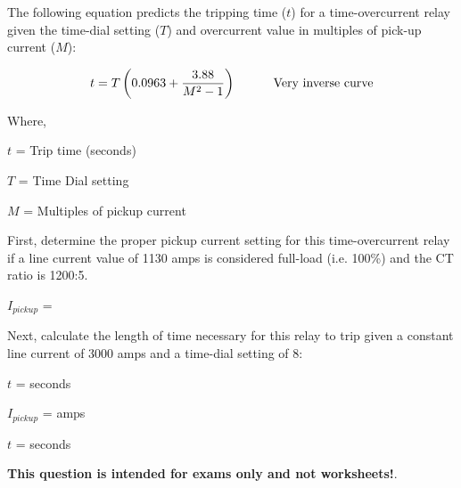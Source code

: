 

The following equation predicts the tripping time ($t$) for a time-overcurrent relay given the time-dial setting ($T$) and overcurrent value in multiples of pick-up current ($M$):


$$t = T \left(0.0963 + {3.88 \over {M^2 - 1}} \right) \hskip 30pt \hbox{Very inverse curve}$$


\noindent
Where,

$t$ = Trip time (seconds)

$T$ = Time Dial setting

$M$ = Multiples of pickup current

\vskip 20pt

\noindent
First, determine the proper pickup current setting for this time-overcurrent relay if a line current value of 1130 amps is considered full-load (i.e. 100\%) and the CT ratio is 1200:5.

\vskip 10pt

$I_{pickup}$ = \underbar{\hskip 50pt}

\vskip 20pt

\noindent
Next, calculate the length of time necessary for this relay to trip given a constant line current of 3000 amps and a time-dial setting of 8:

\vskip 20pt

$t$ = \underbar{\hskip 50pt} seconds

\vskip 10pt







$I_{pickup}$ =  amps

\vskip 10pt

$t$ =  seconds







{\bf This question is intended for exams only and not worksheets!}.



